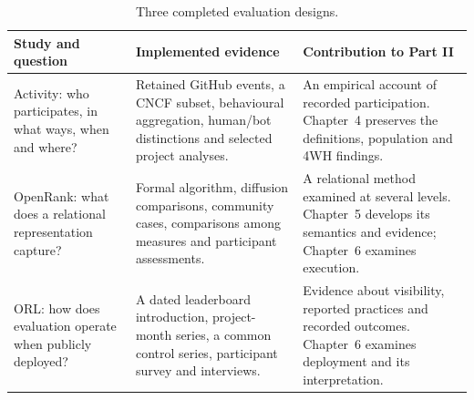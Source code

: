 \begin{table}[tbp]
\caption{Three completed evaluation designs.}
\label{tab:ch3-designs}
\begingroup\fontsize{9.2}{11.8}\selectfont
\renewcommand{\arraystretch}{1.12}
\begin{tabularx}{\textwidth}{@{}>{\raggedright\arraybackslash}p{23mm}>{\raggedright\arraybackslash}X >{\raggedright\arraybackslash}X@{}}
\toprule
\textbf{Study and question} & \textbf{Implemented evidence} & \textbf{Contribution to Part II}\\
\midrule
Activity: who participates, in what ways, when and where? & Retained GitHub events, a CNCF subset, behavioural aggregation, human/bot distinctions and selected project analyses. & An empirical account of recorded participation. Chapter~4 preserves the definitions, population and 4WH findings.\\[5pt]
OpenRank: what does a relational representation capture? & Formal algorithm, diffusion comparisons, community cases, comparisons among measures and participant assessments. & A relational method examined at several levels. Chapter~5 develops its semantics and evidence; Chapter~6 examines execution.\\[5pt]
ORL: how does evaluation operate when publicly deployed? & A dated leaderboard introduction, project-month series, a common control series, participant survey and interviews. & Evidence about visibility, reported practices and recorded outcomes. Chapter~6 examines deployment and its interpretation.\\
\bottomrule
\end{tabularx}
\endgroup
{}
\end{table}
